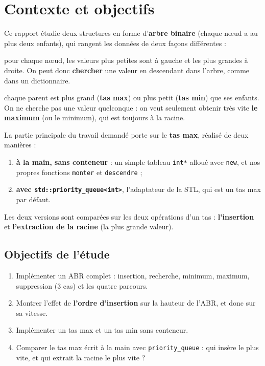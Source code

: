 \documentclass[12pt,a4paper]{report}
\begin{document}
\section{Contexte et objectifs}
Ce rapport étudie deux structures en forme d'\textbf{arbre binaire} (chaque nœud a au plus deux enfants), qui rangent les données de deux façons différentes :
\begin{description}[leftmargin=0.5cm, style=nextline]
  \item[Arbre binaire de recherche (ABR)]
  pour chaque nœud, les valeurs plus petites sont à gauche et les plus grandes à droite. On peut donc \textbf{chercher} une valeur en descendant dans l'arbre, comme dans un dictionnaire.
  \item[Tas (heap)]
  chaque parent est plus grand (\textbf{tas max}) ou plus petit (\textbf{tas min}) que ses enfants. On ne cherche pas une valeur quelconque : on veut seulement obtenir très vite \textbf{le maximum} (ou le minimum), qui est toujours à la racine.
\end{description}

La partie principale du travail demandé porte sur le \textbf{tas max}, réalisé de deux manières :
\begin{enumerate}
  \item \textbf{à la main, sans conteneur} : un simple tableau \texttt{int*} alloué avec \texttt{new}, et nos propres fonctions \texttt{monter} et \texttt{descendre} ;
  \item \textbf{avec \texttt{std::priority\_queue<int>}}, l'adaptateur de la STL, qui est un tas max par défaut.
\end{enumerate}
Les deux versions sont comparées sur les deux opérations d'un tas : \textbf{l'insertion} et \textbf{l'extraction de la racine} (la plus grande valeur).

\subsection{Objectifs de l'étude}
\begin{enumerate}
  \item Implémenter un ABR complet : insertion, recherche, minimum, maximum, suppression (3 cas) et les quatre parcours.
  \item Montrer l'effet de \textbf{l'ordre d'insertion} sur la hauteur de l'ABR, et donc sur sa vitesse.
  \item Implémenter un tas max et un tas min sans conteneur.
  \item Comparer le tas max écrit à la main avec \texttt{priority\_queue} : qui insère le plus vite, et qui extrait la racine le plus vite ?
\end{enumerate}
\end{document}
